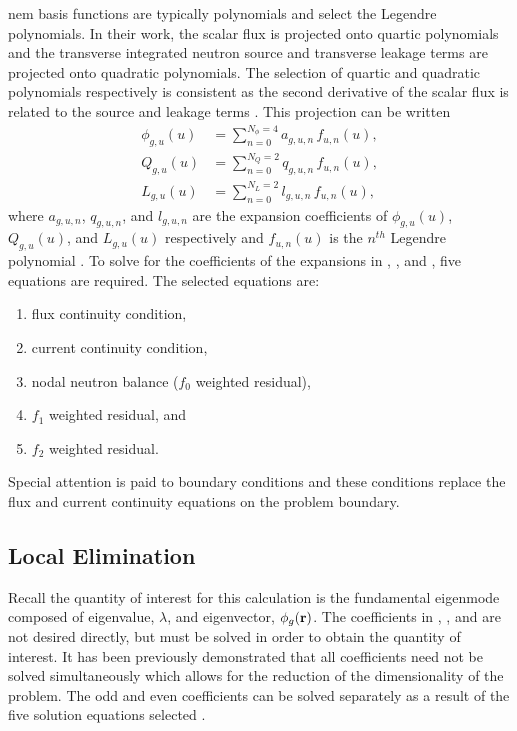     \gls{nem} basis functions are typically polynomials and
    \citeauthor{qe2paper} select the Legendre polynomials. In their work, the
    scalar flux is projected onto quartic polynomials and the transverse
    integrated neutron source and transverse leakage terms are projected onto
    quadratic polynomials. The selection of quartic and quadratic polynomials
    respectively is consistent as the second derivative of the scalar flux is
    related to the source and leakage terms \cite{gehinThesis}. This projection
    can be written
    \begin{align}
      \label{eq:flux_expansion}
      \phi_{g,u}(u) &= \sum_{n=0}^{N_{\phi} = 4} a_{g,u,n} \, f_{u,n}(u), \\
      \label{eq:source_expansion}
      Q_{g,u}(u)    &= \sum_{n=0}^{N_Q = 2}      q_{g,u,n} \, f_{u,n}(u), \\
      \label{eq:leakage_expansion}
      L_{g,u}(u)    &= \sum_{n=0}^{N_L = 2}      l_{g,u,n} \, f_{u,n}(u),
    \end{align}
    where $a_{g,u,n}$, $q_{g,u,n}$, and $l_{g,u,n}$ are the expansion
    coefficients of $\phi_{g,u}(u)$, $Q_{g,u}(u)$, and $L_{g,u}(u)$ respectively
    and $f_{u,n}(u)$ is the $n^{th}$ Legendre polynomial \cite{qe2paper}. To
    solve for the coefficients of the expansions in ,
    , and , five equations
    are required. The selected equations are:
    \begin{enumerate}
      \item flux continuity condition,
      \item current continuity condition,
      \item nodal neutron balance ($f_0$ weighted residual),
      \item $f_1$ weighted residual, and
      \item $f_2$ weighted residual.
    \end{enumerate}
    Special attention is paid to boundary conditions and these conditions 
    replace the flux and current continuity equations on the problem boundary.

  \subsection{Local Elimination}
    \label{sec:local_elimination}

    Recall the quantity of interest for this calculation is the fundamental
    eigenmode composed of eigenvalue, $\lambda$, and eigenvector,
    $\phi_g(\mathbf{r})$. The coefficients in ,
    , and  are not
    desired directly, but must be solved in order to obtain the quantity of
    interest. It has been previously demonstrated that all coefficients need
    not be solved simultaneously which allows for the reduction of the
    dimensionality of the problem. The odd and even coefficients can be solved
    separately as a result of the five solution equations selected
    \cite{gehinThesis}.
    
